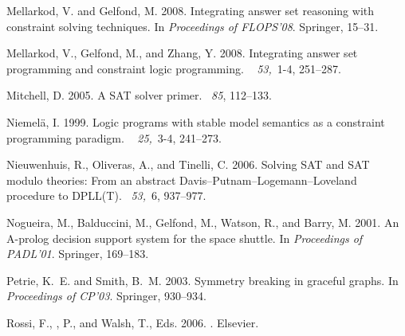 \documentclass{tlp}
\begin{document}
\begin{thebibliography}{}
{\sc Mellarkod, V.} {\sc and} {\sc Gelfond, M.} 2008.
\newblock Integrating answer set reasoning with constraint solving techniques.
\newblock In {\em Proceedings of FLOPS'08}. Springer, 15--31.

{\sc Mellarkod, V.}, {\sc Gelfond, M.}, {\sc and} {\sc Zhang, Y.} 2008.
\newblock Integrating answer set programming and constraint logic programming.
~{\em
  53,\/}~1-4, 251--287.

{\sc Mitchell, D.} 2005.
\newblock A {SAT} solver primer.
~{\em 85}, 112--133.

{\sc Niemel{\"a}, I.} 1999.
\newblock Logic programs with stable model semantics as a constraint
  programming paradigm.
~{\em
  25,\/}~3-4, 241--273.

{\sc Nieuwenhuis, R.}, {\sc Oliveras, A.}, {\sc and} {\sc Tinelli, C.} 2006.
\newblock Solving {SAT} and {SAT} modulo theories: From an abstract
  {D}avis--{P}utnam--{L}ogemann--{L}oveland procedure to {DPLL(T)}.
~{\em 53,\/}~6, 937--977.

{\sc Nogueira, M.}, {\sc Balduccini, M.}, {\sc Gelfond, M.}, {\sc Watson, R.},
  {\sc and} {\sc Barry, M.} 2001.
\newblock An {A}-prolog decision support system for the space shuttle.
\newblock In {\em Proceedings of PADL'01}. Springer, 169--183.

{\sc Petrie, K.~E.} {\sc and} {\sc Smith, B.~M.} 2003.
\newblock Symmetry breaking in graceful graphs.
\newblock In {\em Proceedings of CP'03}. Springer, 930--934.

{\sc Rossi, F.}, {, P.}, {\sc and} {\sc Walsh, T.}, Eds. 2006.
.
\newblock Elsevier.


\end{thebibliography}
\end{document}
